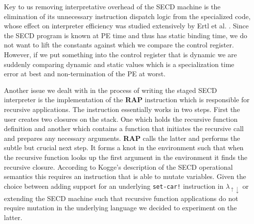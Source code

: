 \documentclass[a4paper,12pt,twoside,openright]{report}
\theoremstyle{definition}
\newcommand{\mslang}{$\lambda_{\uparrow\downarrow}$}
\begin{document}
Key to us removing interpretative overhead of the SECD machine is the elimination of its unnecessary instruction dispatch logic from the specialized code, whose effect on interpreter efficiency was studied extensively by Ertl et al. \cite{ertl2003structure}. Since the SECD program is known at PE time and thus has static binding time, we do not want to lift the constants against which we compare the control register. However, if we put something into the control register that is dynamic we are suddenly comparing dynamic and static values which is a specialization time error at best and non-termination of the PE at worst.

Another issue we dealt with in the process of writing the staged SECD interpreter is the implementation of the \textbf{RAP} instruction which is responsible for recursive applications. The instruction essentially works in two steps. First the user creates two closures on the stack. One which holds the recursive function definition and another which contains a function that initiates the recursive call and prepares any necessary arguments. \textbf{RAP} calls the latter and performs the subtle but crucial next step. It forms a knot in the environment such that when the recursive function looks up the first argument in the environment it finds the recursive closure. According to Kogge's \cite{kogge1990architecture} description of the SECD operational semantics this requires an instruction that is able to mutate variables. Given the choice between adding support for an underlying \texttt{set-car!} instruction in \mslang{} or extending the SECD machine such that recursive function applications do not require mutation in the underlying language we decided to experiment on the latter.



\end{document}
